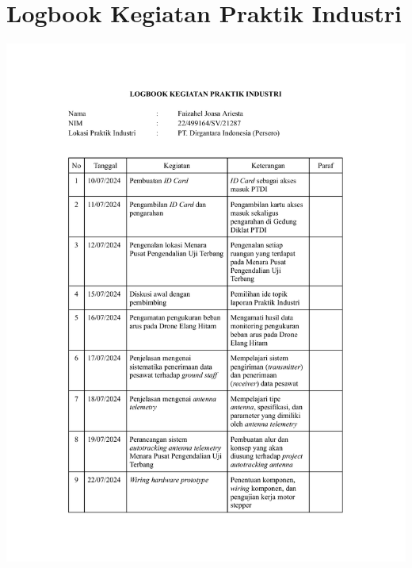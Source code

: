 \section{Logbook Kegiatan Praktik Industri}
\includegraphics[scale=0.7,page=1]{dokumen/logbook.pdf}
\newpage
